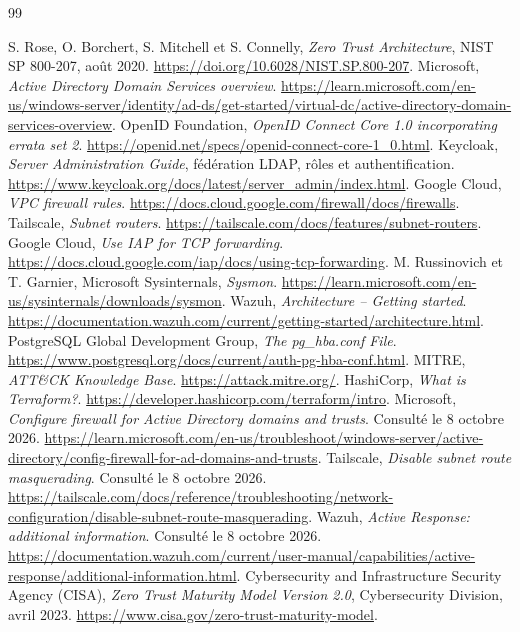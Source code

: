 \documentclass[a4paper,12pt]{report}
\begin{document}
\begin{thebibliography}{99}
\small
{} S. Rose, O. Borchert, S. Mitchell et S. Connelly, \textit{Zero Trust Architecture}, NIST SP 800-207, août 2020. \url{https://doi.org/10.6028/NIST.SP.800-207}.
 Microsoft, \textit{Active Directory Domain Services overview}. \url{https://learn.microsoft.com/en-us/windows-server/identity/ad-ds/get-started/virtual-dc/active-directory-domain-services-overview}.
 OpenID Foundation, \textit{OpenID Connect Core 1.0 incorporating errata set 2}. \url{https://openid.net/specs/openid-connect-core-1_0.html}.
 Keycloak, \textit{Server Administration Guide}, fédération LDAP, rôles et authentification. \url{https://www.keycloak.org/docs/latest/server_admin/index.html}.
 Google Cloud, \textit{VPC firewall rules}. \url{https://docs.cloud.google.com/firewall/docs/firewalls}.
 Tailscale, \textit{Subnet routers}. \url{https://tailscale.com/docs/features/subnet-routers}.
 Google Cloud, \textit{Use IAP for TCP forwarding}. \url{https://docs.cloud.google.com/iap/docs/using-tcp-forwarding}.
 M. Russinovich et T. Garnier, Microsoft Sysinternals, \textit{Sysmon}. \url{https://learn.microsoft.com/en-us/sysinternals/downloads/sysmon}.
 Wazuh, \textit{Architecture -- Getting started}. \url{https://documentation.wazuh.com/current/getting-started/architecture.html}.
 PostgreSQL Global Development Group, \textit{The pg\_hba.conf File}. \url{https://www.postgresql.org/docs/current/auth-pg-hba-conf.html}.
 MITRE, \textit{ATT\&CK Knowledge Base}. \url{https://attack.mitre.org/}.
 HashiCorp, \textit{What is Terraform?}. \url{https://developer.hashicorp.com/terraform/intro}.
 Microsoft, \textit{Configure firewall for Active Directory domains and trusts}. Consulté le 8 octobre 2026. \url{https://learn.microsoft.com/en-us/troubleshoot/windows-server/active-directory/config-firewall-for-ad-domains-and-trusts}.
 Tailscale, \textit{Disable subnet route masquerading}. Consulté le 8 octobre 2026. \url{https://tailscale.com/docs/reference/troubleshooting/network-configuration/disable-subnet-route-masquerading}.
 Wazuh, \textit{Active Response: additional information}. Consulté le 8 octobre 2026. \url{https://documentation.wazuh.com/current/user-manual/capabilities/active-response/additional-information.html}.
 Cybersecurity and Infrastructure Security Agency (CISA), \textit{Zero Trust Maturity Model Version 2.0}, Cybersecurity Division, avril 2023. \url{https://www.cisa.gov/zero-trust-maturity-model}.

\end{thebibliography}
\end{document}

